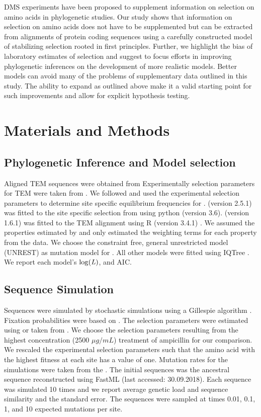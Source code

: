\documentclass[12pt]{article}
\begin{document}
DMS experiments have been proposed to supplement information on selection on amino acids in phylogenetic studies.
Our study shows that information on selection on amino acids does not have to be supplemented but can be extracted from alignments of protein coding sequences using a carefully constructed model of stabilizing selection rooted in first principles.
Further, we highlight the bias of laboratory estimates of selection and suggest to focus efforts in improving phylogenetic inferences on the development of more realistic models.
Better models can avoid many of the problems of supplementary data outlined in this study.
The ability to expand \selac as outlined above make it a valid starting point for such improvements and allow for explicit hypothesis testing.

\section{Materials and Methods}

\subsection{Phylogenetic Inference and Model selection}

Aligned TEM sequences were obtained from \citet{bloom2017}
Experimentally selection parameters for TEM were taken from \citet{stiffler2016}.
We followed \citep{bloom2017} and used the experimental selection parameters to determine site specific equilibrium frequencies for \phydms. 
\phydms (version 2.5.1) was fitted to the site specific selection from \citet{stiffler2016} using python (version 3.6).
\selac (version 1.6.1) was fitted to the TEM alignment using R (version 3.4.1) \citep{rcore}.
We assumed the \PC properties estimated by \citet{grantham1974} and only estimated the weighting terms for each property from the data.
We choose the constraint free, general unrestricted model (UNREST) \citep{Yang1994} as mutation model for \selac.
All other models were fitted using IQTree \citep{nguyen2015}.
We report each model's $\log(\text{\emph{L}})$, and AIC.

\subsection{Sequence Simulation}

Sequences were simulated by stochastic simulations using a Gillespie algorithm \citep{gillespie1976}.
Fixation probabilities were based on \citet{SellaAndHirsh2005}.
The selection parameters were estimated using \selac or taken from \citet{stiffler2016}.
We choose the selection parameters resulting from the highest concentration (2500 $\mu g/mL$) treatment of ampicillin for our comparison.
We rescaled the experimental selection parameters such that the amino acid with the highest fitness at each site has a value of one.
Mutation rates for the simulations were taken from the \selac.
The initial sequences was the ancestral sequence reconstructed using FastML \citep{fastml} (last accessed: 30.09.2018).
Each sequence was simulated 10 times and we report average genetic load and sequence similarity and the standard error.
The sequences were sampled at times 0.01, 0.1, 1, and 10 expected mutations per site.
\end{document}
